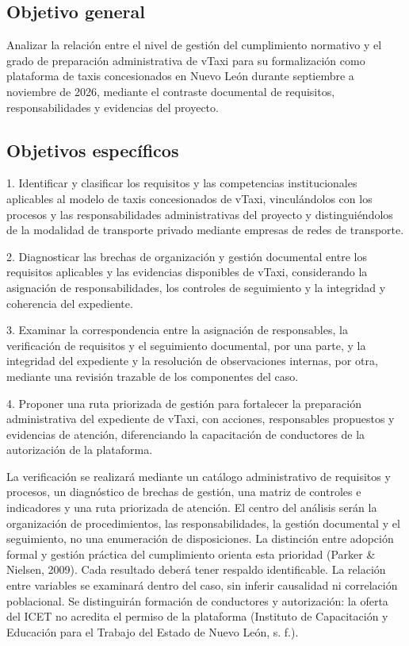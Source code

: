 {\subsection{Objetivo general}
Analizar la relación entre el nivel de gestión del cumplimiento normativo y el grado de preparación administrativa de vTaxi para su formalización como plataforma de taxis concesionados en Nuevo León durante septiembre a noviembre de 2026, mediante el contraste documental de requisitos, responsabilidades y evidencias del proyecto.


\subsection{Objetivos específicos}
1. Identificar y clasificar los requisitos y las competencias institucionales aplicables al modelo de taxis concesionados de vTaxi, vinculándolos con los procesos y las responsabilidades administrativas del proyecto y distinguiéndolos de la modalidad de transporte privado mediante empresas de redes de transporte.


2. Diagnosticar las brechas de organización y gestión documental entre los requisitos aplicables y las evidencias disponibles de vTaxi, considerando la asignación de responsabilidades, los controles de seguimiento y la integridad y coherencia del expediente.


3. Examinar la correspondencia entre la asignación de responsables, la verificación de requisitos y el seguimiento documental, por una parte, y la integridad del expediente y la resolución de observaciones internas, por otra, mediante una revisión trazable de los componentes del caso.


4. Proponer una ruta priorizada de gestión para fortalecer la preparación administrativa del expediente de vTaxi, con acciones, responsables propuestos y evidencias de atención, diferenciando la capacitación de conductores de la autorización de la plataforma.


La verificación se realizará mediante un catálogo administrativo de requisitos y procesos, un diagnóstico de brechas de gestión, una matriz de controles e indicadores y una ruta priorizada de atención. El centro del análisis serán la organización de procedimientos, las responsabilidades, la gestión documental y el seguimiento, no una enumeración de disposiciones. La distinción entre adopción formal y gestión práctica del cumplimiento orienta esta prioridad (Parker \& Nielsen, 2009). Cada resultado deberá tener respaldo identificable. La relación entre variables se examinará dentro del caso, sin inferir causalidad ni correlación poblacional. Se distinguirán formación de conductores y autorización: la oferta del ICET no acredita el permiso de la plataforma (Instituto de Capacitación y Educación para el Trabajo del Estado de Nuevo León, s. f.).

}
